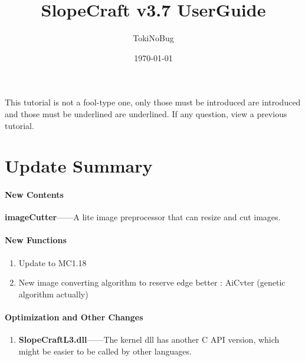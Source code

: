 \documentclass{article}
\title{SlopeCraft v3.7 UserGuide}
\author{TokiNoBug}
\date{\today}
\begin{document}
    \maketitle
    This tutorial is not a fool-type one, only those must be introduced are introduced and those must be underlined are underlined. If any question, view a previous tutorial.

    \pagebreak
    \section{Update Summary}
    \paragraph{New Contents}

    \textbf{imageCutter}——A lite image preprocessor that can resize and cut images.

    \paragraph{New Functions}
    \begin{enumerate}
        \item Update to MC1.18
        \item New image converting algorithm to reserve edge better : AiCvter (genetic algorithm actually)
    \end{enumerate}
    \paragraph{Optimization and Other Changes}
    \begin{enumerate}
        \item \textbf{SlopeCraftL3.dll}——The kernel dll has another C API version, which might be easier to be called by other languages.
    \end{enumerate}

    \pagebreak
\end{document}
